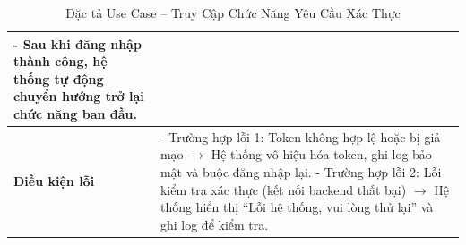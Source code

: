 \begin{table}[H]
\begin{tabularx}{\textwidth}{|l|X|}
\hspace*{1em}- Sau khi đăng nhập thành công, hệ thống tự động chuyển hướng trở lại chức năng ban đầu. \\ \hline
\textbf{Điều kiện lỗi} &
- Trường hợp lỗi 1: Token không hợp lệ hoặc bị giả mạo $\rightarrow$ Hệ thống vô hiệu hóa token, ghi log bảo mật và buộc đăng nhập lại. \newline
- Trường hợp lỗi 2: Lỗi kiểm tra xác thực (kết nối backend thất bại) $\rightarrow$ Hệ thống hiển thị “Lỗi hệ thống, vui lòng thử lại” và ghi log để kiểm tra. \\ \hline
\end{tabularx}
\vspace{15pt}
\caption{Đặc tả Use Case -- Truy Cập Chức Năng Yêu Cầu Xác Thực}
\label{tab:uc_auth_access}
\end{table}



